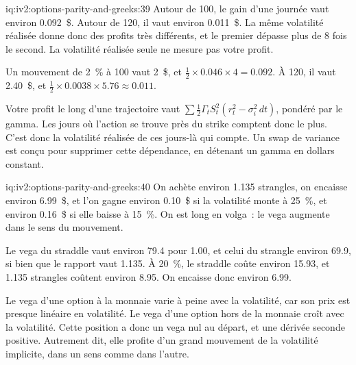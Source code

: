 \begin{solution}{iq:iv2:options-parity-and-greeks:39}
Autour de 100, le gain d'une journée vaut environ 0.092~\$. Autour de 120, il vaut environ 0.011~\$. La même volatilité réalisée donne donc des profits très différents, et le premier dépasse plus de 8 fois le second. La volatilité réalisée seule ne mesure pas votre profit.

Un mouvement de 2~\% à 100 vaut 2~\$, et $\tfrac12 \times 0.046 \times 4 = 0.092$. À 120, il vaut 2.40~\$, et $\tfrac12 \times 0.0038 \times 5.76 \approx 0.011$.

Votre profit le long d'une trajectoire vaut $\sum\tfrac12\Gamma_tS_t^2(r_t^2 - \sigma_i^2\,dt)$, pondéré par le gamma. Les jours où l'action se trouve près du strike comptent donc le plus. C'est donc la volatilité réalisée de ces jours-là qui compte. Un swap de variance est conçu pour supprimer cette dépendance, en détenant un gamma en dollars constant.

\end{solution}

\begin{solution}{iq:iv2:options-parity-and-greeks:40}
On achète environ 1.135 strangles, on encaisse environ 6.99~\$, et l'on gagne environ 0.10~\$ si la volatilité monte à 25~\%, et environ 0.16~\$ si elle baisse à 15~\%. On est long en volga~: le vega augmente dans le sens du mouvement.

Le vega du straddle vaut environ 79.4 pour 1.00, et celui du strangle environ 69.9, si bien que le rapport vaut 1.135. À 20~\%, le straddle coûte environ 15.93, et 1.135 strangles coûtent environ 8.95. On encaisse donc environ 6.99.

Le vega d'une option à la monnaie varie à peine avec la volatilité, car son prix est presque linéaire en volatilité. Le vega d'une option hors de la monnaie croît avec la volatilité. Cette position a donc un vega nul au départ, et une dérivée seconde positive. Autrement dit, elle profite d'un grand mouvement de la volatilité implicite, dans un sens comme dans l'autre.

\end{solution}

